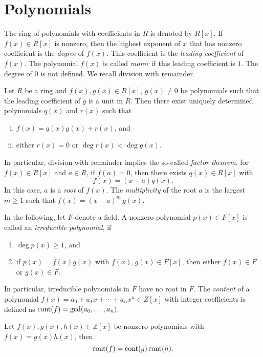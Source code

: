 \section{Polynomials}
\label{sec:polynomials}

The ring of polynomials with coefficients in $R$ is denoted by $R[x]$. If $f(x) ∈ R[x]$ is nonzero, then the highest exponent of $x$ that has nonzero coefficient is the \emph{degree} of $f(x)$. This coefficient is the \emph{leading coefficient} of $f(x)$. The polynomial $f(x)$ is called \emph{monic} if this leading coefficient is $1$. The degree of $0$ is not defined.  We recall division with remainder. 
\begin{theorem}
  \label{thr:5}
  Let $R$ be a ring and $f(x),g(x)∈R[x]$, $g(x) ≠0$  be polynomials such that the leading coefficient of $g$ is a unit in $R$. Then there exist uniquely determined polynomials $q(x)$ and $r(x)$ such that
  \begin{enumerate}[i)]
  \item $f(x) = q(x) g(x) + r(x)$, and
  \item either $r(x) = 0$ or $\deg r(x) < \deg g(x)$.
  \end{enumerate}
\end{theorem}
%
In particular, division with remainder implies the so-called \emph{factor theorem}. for $f(x) ∈ R[x]$ and $a ∈R$, if $f(a) = 0$, then there exists $q(x) ∈ R[x]$ with
\begin{displaymath}
  f(x) = (x - a) q(x). 
\end{displaymath}
In this case, $a$ is a \emph{root} of $f(x)$. The \emph{multiplicity} of the root $a$ is the largest $m≥1$ such that $f(x) = (x-a)^m \, g(x)$.

In the following, let $F$ denote a field. A nonzero polynomial $p(x) ∈ F[x]$ is called an \emph{irreducible polynomial}, if
\begin{enumerate}[(1)]
\item $\deg p(x) ≥1$, and
\item if $p(x) = f(x) g(x)$ with $f(x),g(x) ∈ F[x]$, then either $f(x) ∈ F$ or $g(x) ∈F$. 
\end{enumerate}
In particular, irreducible polynomials in $F$ have no root in $F$.
The \emph{content} of a polynomial $f(x) = a_0 + a_1 x + \cdots + a_n x^n ∈ Z[x]$  with integer coefficients is defined as $\operatorname{cont}(f) = \gcd(a_0,\dots,a_n)$. 

\begin{theorem}
  Let $f(x),g(x), h(x) ∈ℤ[x]$ be nonzero polynomials with $f(x) = g(x) h(x)$, then
  \begin{displaymath}
    \operatorname{cont} (f) = \operatorname{cont} (g) \operatorname{cont} (h).  
  \end{displaymath}
\end{theorem}

